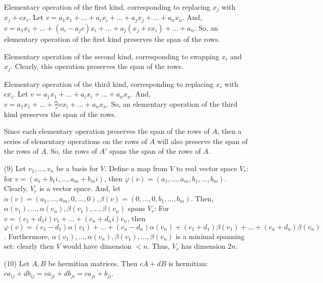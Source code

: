 \begin{itemize}
Elementary operation of the first kind, corresponding to replacing $x_j$ with $x_j + cx_i$. Let $v = a_1x_1 + ... + a_ix_i + ... + a_jx_j + ... + a_nx_n$. And, $v = a_1x_1 + ... + (a_i - a_jc)x_i + ... + a_j(x_j + cx_i) + ... + a_n$.  So, an elementary operation of the first kind preserves the span of the rows.

Elementary operation of the second kind, corresponding to swapping $x_i$ and $x_j$. Clearly, this operation preserves the span of the rows.

Elementary operation of the third kind, corresponding to replacing $x_i$ with $cx_i$. Let $v = a_1x_1 + ... + a_ix_i + ... + a_nx_n$. And, $v = a_1x_1 + ... + \frac{a_i}{c}cx_i + ... + a_nx_n$. So, an elementary operation of the third kind preserves the span of the rows.

Since each elementary operation preserves the span of the rows of $A$, then a series of elementary operations on the rows of $A$ will also preserve the span of the rows of $A$. So, the rows of $A'$ spans the span of the rows of $A$.
\item[(9)]
Let $v_1, ..., v_n$ be a basis for $V$. Define a map from $V$ to real vector space $V_r$: for $v = (a_1 + b_1i, ..., a_m + b_mi)$, then $\varphi(v) = (a_1, ..., a_m, b_1, ..., b_m)$. Clearly, $V_r$ is a vector space. And, let $\alpha(v) = (a_1, ..., a_m, 0, ..., 0), \beta(v) = (0, ..., 0, b_1, ..., b_m)$. Then, $\alpha(v_1), ..., \alpha(v_n), \beta(v_1), ..., \beta(v_n)$ spans $V_r$: For $v = (c_1 + d_1i)v_1 + ... + (c_n + d_ni)v_n$, then $\varphi(v) = (c_1 - d_1)\alpha(v_1) + ... + (c_n - d_n)\alpha(v_n) + (c_1 + d_1)\beta(v_1) + ... + (c_n + d_n)\beta(v_n)$. Furthermore, $\alpha(v_1), ..., \alpha(v_n), \beta(v_1), ..., \beta(v_n)$ is a minimal spanning set: clearly then $V$ would have dimension $< n$. Thus, $V_r$ has dimension $2n$.
\item[(10)]
Let $A, B$ be hermitian matrices. Then $cA + dB$ is hermitian: $ca_{ij} + db_{ij} = c\overline{a}_{ji} + d\overline{b}_{ji} = \overline{ca_{ji} + b_{ji}}$.


\end{itemize}
